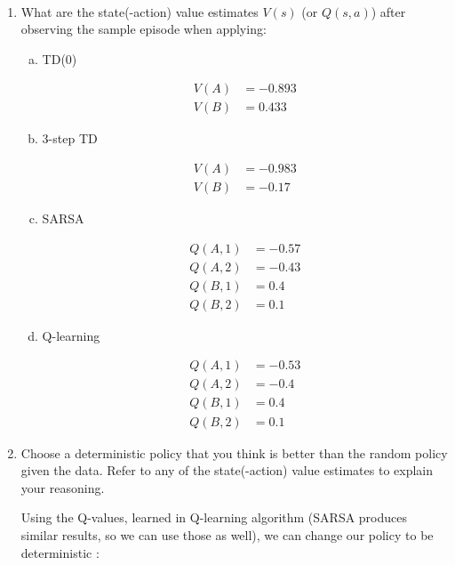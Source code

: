 \documentclass{exam}
\begin{document}
\begin{problem}
\ \newline
\begin{enumerate}
    \item 
    What are the state(-action) value estimates $V(s)$ (or $Q(s,a)$) after observing the sample episode when applying:
    
    \begin{enumerate}[(a)]
        \item TD(0)
        \begin{solutionorlines}[2in]
            \begin{align*}
                V(A) &= -0.893\\
                V(B) &= 0.433
            \end{align*}
        \end{solutionorlines}
        \item 3-step TD
        \begin{solutionorlines}[2in]
            \begin{align*}
                V(A) &= -0.983\\
                V(B) &= -0.17
            \end{align*}
        \end{solutionorlines}
        \item SARSA
        \begin{solutionorlines}[2in]
            \begin{align*}
                Q(A, 1) &= -0.57\\
                Q(A, 2) &= -0.43\\
                Q(B, 1) &= 0.4\\
                Q(B, 2) &= 0.1
            \end{align*}
        \end{solutionorlines}
        \item Q-learning
        \begin{solutionorlines}[2in]
            \begin{align*}
                Q(A, 1) &= -0.53\\
                Q(A, 2) &= -0.4\\
                Q(B, 1) &= 0.4\\
                Q(B, 2) &= 0.1
            \end{align*}
        \end{solutionorlines}
    \end{enumerate}
    \item Choose a deterministic policy that you think is better than the random policy given the data. Refer to any of the state(-action) value estimates to explain your reasoning.
    \begin{solutionorlines}[2in]
    Using the Q-values, learned in Q-learning algorithm (SARSA produces similar results, so we can use those as well), we can change our policy to be deterministic :
    

\end{solutionorlines}
\end{enumerate}
\end{problem}
\end{document}
